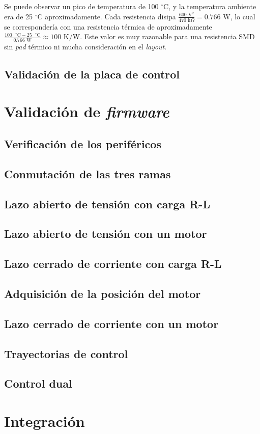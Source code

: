 Se puede observar un pico de temperatura de 100 $^{\circ}$C, y la temperatura ambiente era de 25 $^{\circ}$C aproximadamente. Cada resistencia disipa $\frac{600 \text{ V}^2}{470 \text{ k}\Omega} = 0.766 \text{ W}$, lo cual se correspondería con una resistencia térmica de aproximadamente $ \frac{100 \text{ }^{\circ}\text{C} - 25 \text{ }^{\circ}\text{C}}{0.766 \text{ W}} \approx 100 \text{ K/W}$. Este valor es muy razonable para una resistencia SMD sin \textit{pad} térmico ni mucha consideración en el \textit{layout}.

\subsection{Validación de la placa de control}


\section{Validación de \textit{firmware}}
\subsection{Verificación de los periféricos}

\subsection{Conmutación de las tres ramas}

\subsection{Lazo abierto de tensión con carga R-L}

\subsection{Lazo abierto de tensión con un motor}

\subsection{Lazo cerrado de corriente con carga R-L}

\subsection{Adquisición de la posición del motor}

\subsection{Lazo cerrado de corriente con un motor}

\subsection{Trayectorias de control}

\subsection{Control dual}

\section{Integración}
